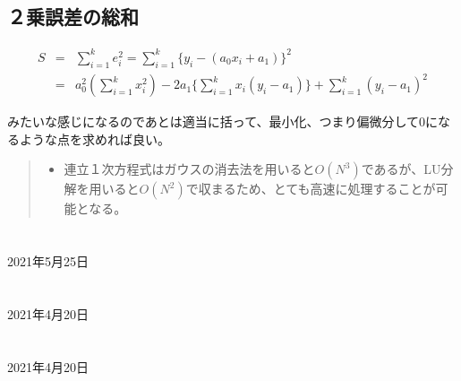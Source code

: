 \documentclass[dvipdfmx,uplatex]{jsarticle}
\begin{document}
\begin{spacing}{1.4}
\subsection{２乗誤差の総和}
\begin{eqnarray}
  S &=& \sum_{i=1}^{k}e_i^2 = \sum_{i=1}^{k} \{y_i - (a_0x_i + a_1)\}^2 \\
    &=& a_0^2(\sum_{i=1}^{k} x_i^2) - 2a_1\{\sum_{i=1}^{k} x_i(y_i - a_1)\} + \sum_{i=1}^{k}(y_i - a_1)^2
\end{eqnarray}

みたいな感じになるのであとは適当に括って、最小化、つまり偏微分して0になるような点を求めれば良い。\\

\begin{quote}
 \begin{itemize}
  \item 連立１次方程式はガウスの消去法を用いると$O(N^3)$であるが、LU分解を用いると$O(N^2)$で収まるため、とても高速に処理することが可能となる。
 \end{itemize}
\end{quote}
\newpage

\section{}
\begin{center}
  2021年5月25日 \\
\end{center}

\newpage

\section{}
\begin{center}
  2021年4月20日 \\
\end{center}

\newpage

\section{}
\begin{center}
  2021年4月20日 \\
\end{center}

\newpage

\section{}

\newpage

\section{}

\newpage

\end{spacing}
\end{document}
